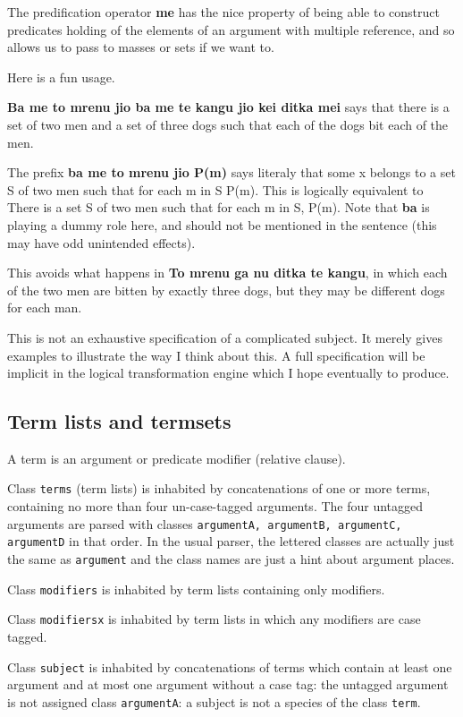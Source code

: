 \documentclass[12pt]{book}
\begin{document}
The predification operator {\bf me} has the nice property of being able to construct predicates holding of the elements of an argument with multiple reference, and so allows us to pass to masses or sets if we want to.

Here is a fun usage.

{\bf Ba me to mrenu jio ba me te kangu jio kei ditka mei} says that there is a set of two men and a set of three dogs such that each of the dogs bit each of the men.

The prefix {\bf ba me to mrenu jio P(m)} says literaly that some x belongs to a set S of two men such that for each m in S P(m).  This is logically equivalent to There is a set S of two men such that for each m in S, P(m).  Note that {\bf ba} is playing a dummy role here, and should not be mentioned in the sentence
(this may have odd unintended effects).

This avoids what happens in {\bf To mrenu ga nu ditka te kangu}, in which each of the two men are bitten by exactly three dogs, but they may be different dogs for each man.

This is not an exhaustive specification of a complicated subject.  It merely gives examples to illustrate the way I think about this.  A full specification will be implicit in the logical transformation engine which I hope eventually to produce.

\subsection{Term lists and termsets}

A term is an argument or predicate modifier (relative clause).

Class {\tt terms} (term lists) is inhabited by concatenations of one or more terms, containing no more than four
un-case-tagged arguments.  The four untagged arguments are parsed with 
classes {\tt argumentA, argumentB, argumentC, argumentD} in that order.  In the usual parser, the lettered classes are actually just the same as {\tt argument} and the class names are just a hint about argument places.  

Class {\tt modifiers} is inhabited by term lists containing only modifiers.

Class {\tt modifiersx} is inhabited by term lists in which any modifiers are case tagged.

Class {\tt subject} is inhabited by concatenations of terms which contain at least one argument and at most one argument without a case tag:
the untagged argument is not assigned class {\tt argumentA}:  a subject is not a species of the class {\tt term}.  
\end{document}
